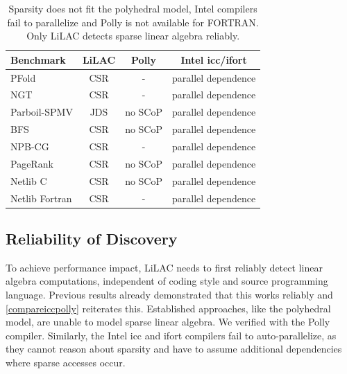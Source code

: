 \begin{table}[b]
\centering
\caption{Sparsity does not fit the polyhedral model, Intel compilers fail to
         parallelize and Polly is not available for FORTRAN.
         Only LiLAC detects sparse linear algebra reliably.}
\label{compareiccpolly}
\vspace{-0.5em}
\small
\begin{tabular}{l|c|c|c}
{\bf Benchmark}      & {\bf LiLAC}    & {\bf Polly}   & {\bf Intel icc/ifort} \\
\hline
\hline
PFold          & CSR & - & parallel dependence \\[-0.3em]
NGT            & CSR & - & parallel dependence \\[-0.3em]
Parboil-SPMV   & JDS & no SCoP & parallel dependence \\[-0.3em]
BFS            & CSR & no SCoP & parallel dependence \\[-0.3em]
NPB-CG         & CSR & - & parallel dependence \\[-0.3em]
PageRank       & CSR & no SCoP & parallel dependence \\[-0.3em]
Netlib C       & CSR & no SCoP & parallel dependence \\[-0.3em]
Netlib Fortran & CSR & - & parallel dependence \\
\end{tabular}
\end{table}

\subsection{Reliability of Discovery}
To achieve performance impact, LiLAC needs to first reliably detect linear
algebra computations, independent of coding style and source programming
language.
Previous results already demonstrated that this works reliably and
\autoref{compareiccpolly} \mbox{reiterates} this.
Established approaches, like the polyhedral model, are unable to model sparse
linear algebra. We verified with the Polly compiler.
Similarly, the Intel icc and ifort compilers fail to auto-parallelize, as they
cannot reason about sparsity and have to assume additional dependencies where
sparse accesses occur.






